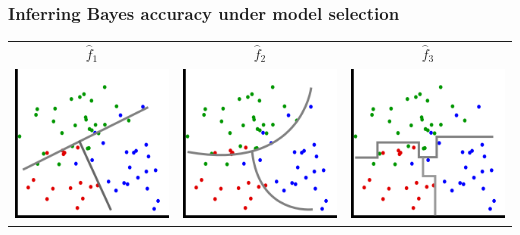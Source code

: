 \documentclass{beamer}
\begin{document}
\begin{frame}
\frametitle{Inferring Bayes accuracy under model selection}
\begin{center}
\begin{tabular}{ccc}
$\hat{f}_1$ & $\hat{f}_2$ & $\hat{f}_3$\\
\includegraphics[scale = 0.2]{model1.png} &
\includegraphics[scale = 0.2]{model2.png} &
\includegraphics[scale = 0.2]{model3.png}

\end{tabular}
\end{center}
\end{frame}
\end{document}
